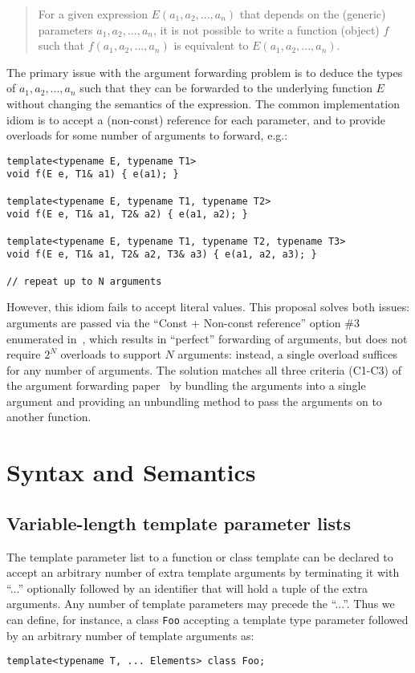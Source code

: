 \documentclass{article}
\begin{document}
\begin{quote}
  For a given expression $E(a_1, a_2, ..., a_n)$ that depends on the
  (generic) parameters $a_1, a_2, ..., a_n$, it is not possible to
  write a function (object) $f$ such that $f(a_1, a_2, ..., a_n)$ is
  equivalent to $E(a_1, a_2, ..., a_n)$.
\end{quote}

The primary issue with the argument forwarding problem is to deduce
the types of $a_1, a_2, ..., a_n$ such that they can be forwarded to
the underlying function $E$ without changing the semantics of the
expression. The common implementation idiom is to accept a (non-const)
reference for each parameter, and to provide overloads for some number
of arguments to forward, e.g.:
\begin{verbatim}
template<typename E, typename T1>
void f(E e, T1& a1) { e(a1); }

template<typename E, typename T1, typename T2>
void f(E e, T1& a1, T2& a2) { e(a1, a2); }

template<typename E, typename T1, typename T2, typename T3>
void f(E e, T1& a1, T2& a2, T3& a3) { e(a1, a2, a3); }

// repeat up to N arguments
\end{verbatim}

However, this idiom fails to accept literal values. This proposal
solves both issues: arguments are passed via the ``Const + Non-const
reference'' option \#3 enumerated in~\cite{Dimov02}, which results in
``perfect'' forwarding of arguments, but does not require $2^N$
overloads to support $N$ arguments: instead, a single overload
suffices for any number of arguments. The solution matches all three
criteria (C1-C3) of the argument forwarding paper~\cite{Dimov02} by
bundling the arguments into a single argument and providing an
unbundling method to pass the arguments on to another function.

\section{Syntax and Semantics}
\subsection{Variable-length template parameter lists}
\par The template parameter list to a function or class template can
be declared to accept an arbitrary number of extra template arguments
by terminating it with ``...'' optionally followed by an identifier
that will hold a tuple of the extra arguments. Any number of template
parameters may precede the ``...''. Thus we can define, for instance,
a class {\tt Foo} accepting a template type parameter followed by an
arbitrary number of template arguments as:
\begin{verbatim}
template<typename T, ... Elements> class Foo;
\end{verbatim}
\end{document}
